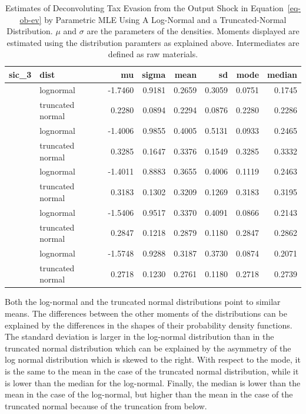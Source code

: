 \documentclass[
  12pt]{article}
\theoremstyle{definition}
\theoremstyle{remark}
\begin{document}
\begin{longtable}[t]{llrrrrrr}

\caption{\label{tbl-deconv-mle-both}Estimates of Deconvoluting Tax
Evasion from the Output Shock in Equation~\ref{eq-ob-ev} by Parametric
MLE Using A Log-Normal and a Truncated-Normal Distribution. \(\mu\) and
\(\sigma\) are the parameters of the densities. Moments displayed are
estimated using the distribution paramters as explained above.
Intermediates are defined as raw materials.}

\tabularnewline

\toprule
sic\_3 & dist & mu & sigma & mean & sd & mode & median\\
\midrule
 & lognormal & -1.7460 & 0.9181 & 0.2659 & 0.3059 & 0.0751 & 0.1745\\
\cmidrule{2-8}\nopagebreak
\multirow[t]{-2}{*}{\raggedright\arraybackslash 311} & truncated normal & 0.2280 & 0.0894 & 0.2294 & 0.0876 & 0.2280 & 0.2286\\
\cmidrule{1-8}\pagebreak[0]
 & lognormal & -1.4006 & 0.9855 & 0.4005 & 0.5131 & 0.0933 & 0.2465\\
\cmidrule{2-8}\nopagebreak
\multirow[t]{-2}{*}{\raggedright\arraybackslash 313} & truncated normal & 0.3285 & 0.1647 & 0.3376 & 0.1549 & 0.3285 & 0.3332\\
\cmidrule{1-8}\pagebreak[0]
 & lognormal & -1.4011 & 0.8883 & 0.3655 & 0.4006 & 0.1119 & 0.2463\\
\cmidrule{2-8}\nopagebreak
\multirow[t]{-2}{*}{\raggedright\arraybackslash 321} & truncated normal & 0.3183 & 0.1302 & 0.3209 & 0.1269 & 0.3183 & 0.3195\\
\cmidrule{1-8}\pagebreak[0]
 & lognormal & -1.5406 & 0.9517 & 0.3370 & 0.4091 & 0.0866 & 0.2143\\
\cmidrule{2-8}\nopagebreak
\multirow[t]{-2}{*}{\raggedright\arraybackslash 352} & truncated normal & 0.2847 & 0.1218 & 0.2879 & 0.1180 & 0.2847 & 0.2862\\
\cmidrule{1-8}\pagebreak[0]
 & lognormal & -1.5748 & 0.9288 & 0.3187 & 0.3730 & 0.0874 & 0.2071\\
\cmidrule{2-8}\nopagebreak
\multirow[t]{-2}{*}{\raggedright\arraybackslash 383} & truncated normal & 0.2718 & 0.1230 & 0.2761 & 0.1180 & 0.2718 & 0.2739\\
\bottomrule

\end{longtable}

Both the log-normal and the truncated normal distributions point to
similar means. The differences between the other moments of the
distributions can be explained by the differences in the shapes of their
probability density functions. The standard deviation is larger in the
log-normal distribution than in the truncated normal distribution which
can be explained by the asymmetry of the log normal distribution which
is skewed to the right. With respect to the mode, it is the same to the
mean in the case of the truncated normal distribution, while it is lower
than the median for the log-normal. Finally, the median is lower than
the mean in the case of the log-normal, but higher than the mean in the
case of the truncated normal because of the truncation from below.
\end{document}

